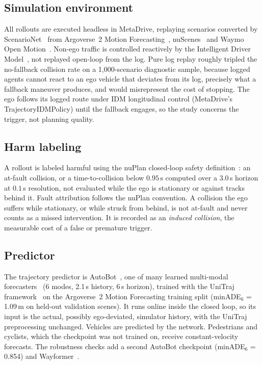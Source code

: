 \documentclass[lettersize,journal]{IEEEtran}
\begin{document}
\subsection{Simulation environment}
All rollouts are executed headless in MetaDrive, replaying scenarios
converted by ScenarioNet~\cite{scenarionet2023} from Argoverse~2 Motion
Forecasting~\cite{av2motion2021}, nuScenes~\cite{nuscenes2020} and Waymo Open Motion~\cite{waymo2021}.
Non-ego traffic is controlled reactively by the Intelligent Driver
Model~\cite{idm2000}, not replayed open-loop from the log. Pure log
replay roughly tripled the no-fallback collision rate on a 1{,}000-scenario
diagnostic sample, because logged agents cannot react to an ego vehicle
that deviates from its log, precisely what a fallback maneuver produces,
and would misrepresent the cost of stopping. The ego follows its logged route under IDM longitudinal control (MetaDrive's TrajectoryIDMPolicy) until the fallback engages, so the study concerns the trigger, not planning quality.

\subsection{Harm labeling}
\label{sec:harm}
A rollout is labeled harmful using the nuPlan closed-loop safety
definition~\cite{nuplan2024}: an at-fault collision, or a
time-to-collision below $0.95\,\mathrm{s}$ computed over a $3.0\,$s
horizon at $0.1\,$s resolution, not evaluated while the ego is
stationary or against tracks behind it. Fault attribution follows the
nuPlan convention. A collision the ego suffers while stationary, or while
struck from behind, is not at-fault and never counts as a missed
intervention. It is recorded as an \emph{induced collision}, the
measurable cost of a false or premature trigger.

\subsection{Predictor}
The trajectory predictor is AutoBot~\cite{autobot2022}, one of many
learned multi-modal forecasters~\cite{shi2025survey} (6 modes, 2.1\,s
history, 6\,s horizon), trained with the UniTraj framework~\cite{unitraj2024}
on the Argoverse~2 Motion Forecasting training split (minADE$_6$ = 1.09\,m
on held-out validation scenes). It runs online inside the closed loop, so
its input is the actual, possibly ego-deviated, simulator history, with
the UniTraj preprocessing unchanged. Vehicles are predicted by the
network. Pedestrians and cyclists, which the checkpoint was not trained
on, receive constant-velocity forecasts. The robustness checks add a second
AutoBot checkpoint (minADE$_6$ = 0.854) and Wayformer~\cite{wayformer2022}.
\end{document}
